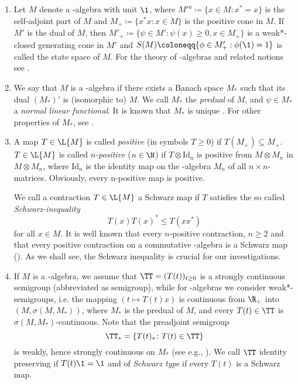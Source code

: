 \begin{enumerate}[1., wide, labelsep=1em, itemindent=\parindent]

\item
Let $ M $ denote a \CA-algebra with unit $ \1 $, where 
%
$
	M^{sa} \coloneqq \{x \in M \colon x^{*} = x\} 
$
%
is the self-adjoint part of $ M $ and 
%
$
	M_{+} \coloneqq \{ x^{*}x \colon x \in M\} 
$
%
is the positive cone in $ M $.
If $ M' $ is the dual of $ M $, then 
%
$
	M'_{+} \coloneqq \{\psi \in M' \colon \psi(x) \geq 0, x \in M_{+}\} 
$
%
is a weak*-closed generating cone in $ M' $ and 
%
$
	S(M) \coloneqq \{\phi \in M'_{+}: \phi(\1) = 1\} 
$
%
is called the state space of $ M $. 
For the theory of \CA-algebras and related notions see \citet{Pedersen:1979}.

\item
We say that $ M $ is a \WA-algebra if there exists a Banach space $ M_{*} $ such that its dual $ (M_{*})' $ is (isomorphic to) $ M $.
We call $ M_{*} $ the \emph{predual} of $ M $, and $ \psi \in M_{*} $ a \emph{normal linear functional}.
It is known that $ M_{*} $ is unique \cite[1.13.3]{sakai:1971}.
For other properties of $M_{*} $, see \cite[Chapter III]{takesaki:1979}.
\item
A map $ T \in \L{M} $ is called \emph{positive} (in symbols $ T \geq 0 $) if $ T(M_{+}) \subseteq M_{+} $.
$ T \in \L{M} $ is called \emph{$n$-positive} ($ n \in \N $) if $ T \otimes \text{Id}_{n} $ is positive from $ M \otimes M_{n} $ in $ M \otimes M_{n} $, where $ \text{Id}_{n} $ is the identity map on the \CA-algebra $ M_{n} $ of all $ n \times n $-matrices.
Obviously, every n-positive map is positive.

We call a contraction $ T \in \L{M} $ a Schwarz map if $ T $ satisfies the so called \emph{Schwarz-inequality}
\[
	T(x)T(x)^{*} \leq T(xx^{*}) 
\]
for all $ x \in M $.
It is well known that every $n$-positive contraction, $ n \geq 2 $ and that every positive contraction on a commutative \CA-algebra is a Schwarz map (\cite[Corollary IV. 3.8.]{takesaki:1979}).
As we shall see, the Schwarz inequality is crucial for our investigations.

\item 
If $ M $ is a \CA-algebra, we assume that $ \TT = (T(t))_{t \geq 0} $ is a strongly continuous semigroup (abbreviated as semigroup), while for \WA-algebras we consider weak*-semigroups, i.e. the mapping $ (t \mapsto T(t)x) $ is continuous from $ \R_{+} $ into $ (M,\sigma(M,M_{*}))$, where $ M_{*} $ is the predual of $ M $, and every $ T(t) \in \TT $ is $ \sigma(M,M_{*}) $-continuous.
Note that the preadjoint semigroup
\[
	\TT_{*} = \{ T(t)_{*} \colon T(t) \in \TT \}
\]
is weakly, hence strongly continuous on $ M_{*} $ (see e.g., \cite[Prop. 1.23]{davies:1980}).
%
We call $ \TT $ identity preserving if $ T(t)\1 = \1 $ and of \emph{Schwarz type} if every $ T(t) $ is a Schwarz map.

\end{enumerate}
